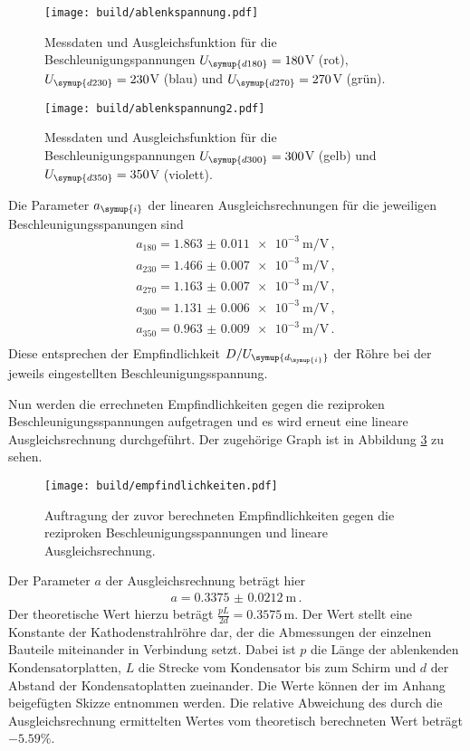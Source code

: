 \begin{figure}[h!]
  \centering
  \texttt{[image: build/ablenkspannung.pdf]}
  \caption{Messdaten und Ausgleichsfunktion für die Beschleunigungspannungen
  $U_{\symup{d180}}=180$V (rot), $U_{\symup{d230}}=230$V (blau) und $U_{\symup{d270}}=270$V (grün).}
  \label{fig:ablenkspannung}
\end{figure}

\begin{figure}[h!]
  \centering
  \texttt{[image: build/ablenkspannung2.pdf]}
  \caption{Messdaten und Ausgleichsfunktion für die Beschleunigungspannungen
  $U_{\symup{d300}}=300$V (gelb) und $U_{\symup{d350}}=350$V (violett).}
  \label{fig:ablenkspannung2}
\end{figure}

Die Parameter $a_{\symup{i}}$ der linearen Ausgleichsrechnungen für die jeweiligen
Beschleunigungsspanungen sind
\begin{align*}
  a_{180} = \SI{1.863(0011)e-3}{\meter\per\volt} \,, \\
  a_{230} = \SI{1.466(0007)e-3}{\meter\per\volt}  \,, \\
  a_{270} = \SI{1.163(0007)e-3}{\meter\per\volt}  \,,\\
  a_{300} = \SI{1.131(0006)e-3}{\meter\per\volt}  \,,\\
  a_{350} = \SI{0.963(0009)e-3}{\meter\per\volt} \,.\\
\end{align*}
Diese entsprechen der Empfindlichkeit $D/U_{\symup{d_{\symup{i}}}}$ der Röhre bei
der jeweils eingestellten Beschleunigungsspannung.

Nun werden die errechneten Empfindlichkeiten gegen die reziproken Beschleunigungsspannungen
aufgetragen und es wird erneut eine lineare Ausgleichsrechnung durchgeführt. Der
zugehörige Graph ist in Abbildung \ref{fig:empfindlichkeiten} zu sehen.

\begin{figure}[h!]
  \centering
  \texttt{[image: build/empfindlichkeiten.pdf]}
  \caption{Auftragung der zuvor berechneten Empfindlichkeiten gegen die reziproken
  Beschleunigungsspannungen und lineare Ausgleichsrechnung.}
  \label{fig:empfindlichkeiten}
\end{figure}

Der Parameter $a$ der Ausgleichsrechnung beträgt hier
\begin{align*}
  a=\SI{0.3375(00212)}{\meter} \,.
\end{align*}
Der theoretische Wert hierzu beträgt $\frac{pL}{2d}=0.3575\,$m. Der Wert stellt eine
Konstante der Kathodenstrahlröhre dar, der die Abmessungen der einzelnen Bauteile
miteinander in Verbindung setzt. Dabei ist $p$ die
Länge der ablenkenden Kondensatorplatten, $L$ die Strecke vom Kondensator bis zum
Schirm und $d$ der Abstand der Kondensatoplatten zueinander. Die Werte können der
im Anhang beigefügten Skizze entnommen werden. Die relative Abweichung
des durch die Ausgleichsrechnung ermittelten Wertes vom theoretisch berechneten Wert
beträgt $-5.59\%$.




